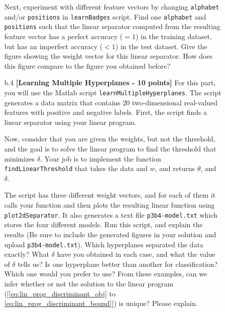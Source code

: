 \begin{enumerate}
\begin{enumerate}
\begin{enumerate}
      Next, experiment with different feature vectors by changing {\tt alphabet} and/or {\tt positions}
      in {\tt learnBadges} script.
      Find one {\tt alphabet} and {\tt positions} such that the linear separator computed
      from the resulting feature vector has a perfect accuracy ($=1$) in the training dataset,
      but has an imperfect accuracy ($<1$) in the test dataset.
      Give the figure showing the weight vector for this linear separator.
      How does this figure compare to the figure you obtained before?

\item [b.4] \textbf{[Learning Multiple Hyperplanes - 10 points]}
      For this part, you will use the Matlab script {\tt learnMultipleHyperplanes}.
      The script generates a data matrix that contains 20 two-dimensional real-valued features
      with positive and negative labels.
      First, the script finds a linear separator using your linear program.
      
      Now, consider that you are given the weights, but not the threshold,
      and the goal is to solve the linear program to find the threshold
      that minimizes $\delta$.
      Your job is to implement the function {\tt findLinearThreshold} that takes the data
      and $w$,
      and returns $\theta$, and $\delta$.
      
      The script has three different weight vectors, and for each of them it calls your function
      and then plots the resulting linear function using {\tt 
      plot2dSeparator}. It also generates a text file {\tt p3b4-model.txt} 
      which stores the four different models. 
      Run this script, and explain the results (Be sure to include the 
      generated figures in your solution and upload {\tt p3b4-model.txt}).
      Which hyperplanes separated the data exactly? 
      What $\delta$ have you obtained in each case, and what the value of $\delta$ tells us?
      Is one hyperplane better than another for classification? Which one would you prefer to use?
      From these examples,
      can we infer whether or not
      the solution to the linear program
      ([\eqref{eq:lin_prog_discriminant_obj} to \eqref{eq:lin_prog_discriminant_bound}]) is unique?
      Please explain. 

\end{enumerate}



\end{enumerate}
\end{enumerate}

